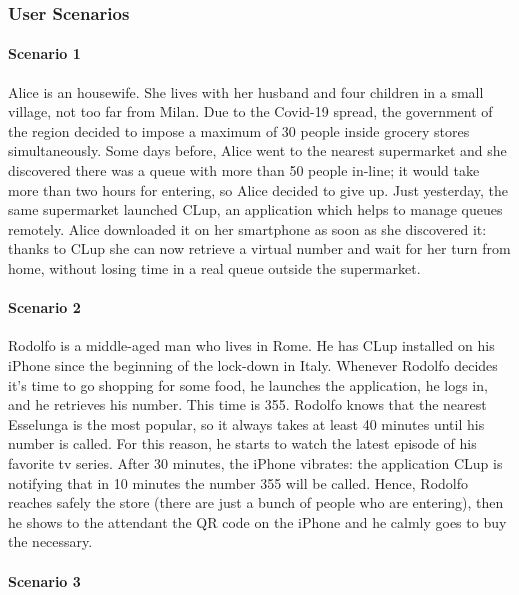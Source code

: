 \documentclass[table, 12pt]{article}
\begin{document}
\begin{flushleft}
    \subsubsection{User Scenarios}
    \paragraph{Scenario 1}

    Alice is an housewife. She lives with her husband and four children in a small village, not too far from Milan. Due to the Covid-19 spread, the government of the region decided to impose a maximum of 30 people inside grocery stores simultaneously. Some days before, Alice went to the nearest supermarket and she discovered there was a queue with more than 50 people in-line; it would take more than two hours for entering, so Alice decided to give up. Just yesterday, the same supermarket launched CLup, an application which helps to manage queues remotely. Alice downloaded it on her smartphone as soon as she discovered it: thanks to CLup she can now retrieve a virtual number and wait for her turn from home, without losing time in a real queue outside the supermarket.\\


    \paragraph{Scenario 2}

    Rodolfo is a middle-aged man who lives in Rome. He has CLup installed on his iPhone since the beginning of the lock-down in Italy. Whenever Rodolfo decides it's time to go shopping for some food, he launches the application, he logs in, and he retrieves his number. This time is 355. Rodolfo knows that the nearest Esselunga is the most popular, so it always takes at least 40 minutes until his number is called. For this reason, he starts to watch the latest episode of his favorite tv series. After 30 minutes, the iPhone vibrates: the application CLup is notifying that in 10 minutes the number 355 will be called. Hence, Rodolfo reaches safely the store (there are just a bunch of people who are entering), then he shows to the attendant the QR code on the iPhone and he calmly goes to buy the necessary. \\



    \paragraph{Scenario 3}


\end{flushleft}
\end{document}
